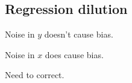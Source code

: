 
\subsection{Regression dilution}

Noise in \(y\) doesn't cause bias.

Noise in \(x\) does cause bias.

Need to correct.
